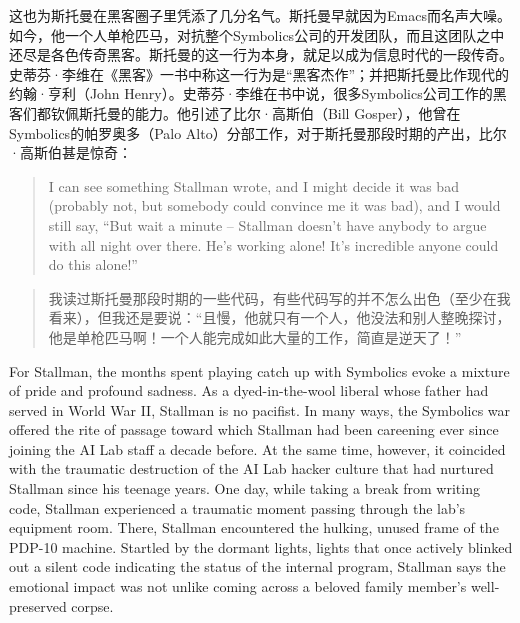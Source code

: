 \ifdefined\chs
这也为斯托曼在黑客圈子里凭添了几分名气。斯托曼早就因为Emacs而名声大噪。如今，他一个人单枪匹马，对抗整个Symbolics公司的开发团队，而且这团队之中还尽是各色传奇黑客。斯托曼的这一行为本身，就足以成为信息时代的一段传奇。史蒂芬·李维在《黑客》一书中称这一行为是``黑客杰作''；并把斯托曼比作现代的约翰·亨利（John Henry）。史蒂芬·李维在书中说，很多Symbolics公司工作的黑客们都钦佩斯托曼的能力。他引述了比尔·高斯伯（Bill Gosper），他曾在Symbolics的帕罗奥多（Palo Alto）分部工作，对于斯托曼那段时期的产出，比尔·高斯伯甚是惊奇：
\fi

\ifdefined\eng
\begin{quote}
I can see something Stallman wrote, and I might decide it was bad (probably not, but somebody could convince me it was bad), and I would still say, ``But wait a minute -- Stallman doesn't have anybody to argue with all night over there. He's working alone! It's incredible anyone could do this alone!''
\end{quote}
\fi

\ifdefined\chs
\begin{quote}
我读过斯托曼那段时期的一些代码，有些代码写的并不怎么出色（至少在我看来），但我还是要说：``且慢，他就只有一个人，他没法和别人整晚探讨，他是单枪匹马啊！一个人能完成如此大量的工作，简直是逆天了！''
\end{quote}
\fi

\ifdefined\eng
For Stallman, the months spent playing catch up with Symbolics evoke a mixture of pride and profound sadness. As a dyed-in-the-wool liberal whose father had served in World War II, Stallman is no pacifist. In many ways, the Symbolics war offered the rite of passage toward which Stallman had been careening ever since joining the AI Lab staff a decade before. At the same time, however, it coincided with the traumatic destruction of the AI Lab hacker culture that had nurtured Stallman since his teenage years. One day, while taking a break from writing code, Stallman experienced a traumatic moment passing through the lab's equipment room. There, Stallman encountered the hulking, unused frame of the PDP-10 machine. Startled by the dormant lights, lights that once actively blinked out a silent code indicating the status of the internal program, Stallman says the emotional impact was not unlike coming across a beloved family member's well-preserved corpse.
\fi

